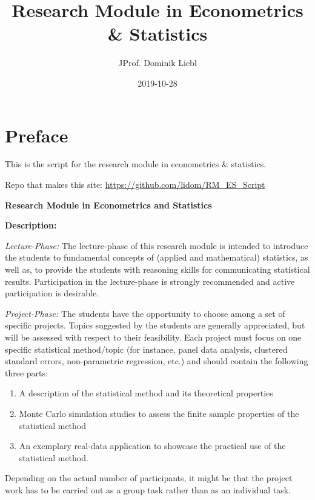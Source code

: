 \documentclass[]{book}
\title{Research Module in Econometrics \& Statistics}
\author{JProf. Dominik Liebl}
\date{2019-10-28}
\providecommand{\tightlist}{%
  \setlength{\itemsep}{0pt}\setlength{\parskip}{0pt}}
\theoremstyle{definition}
\theoremstyle{definition}
\theoremstyle{definition}
\theoremstyle{remark}
\begin{document}
\maketitle

{
\setcounter{tocdepth}{1}
\tableofcontents
}
\hypertarget{preface}{%
\chapter*{Preface}\label{preface}}

This is the script for the research module in econometrics \& statistics.

Repo that makes this site: \url{https://github.com/lidom/RM_ES_Script}

\textbf{Research Module in Econometrics and Statistics}

\textbf{Description:}

\emph{Lecture-Phase:} The lecture-phase of this research module is intended to introduce the students to fundamental concepts of (applied and mathematical) statistics, as well as, to provide the students with reasoning skills for communicating statistical results. Participation in the lecture-phase is strongly recommended and active participation is desirable.

\emph{Project-Phase:} The students have the opportunity to choose among a set of specific projects. Topics suggested by the students are generally appreciated, but will be assessed with respect to their feasibility. Each project must focus on one specific statistical method/topic (for instance, panel data analysis, clustered standard errors, non-parametric regression, etc.) and should contain the following three parts:

\begin{enumerate}
\def\labelenumi{\arabic{enumi}.}
\tightlist
\item
  A description of the statistical method and its theoretical properties
\item
  Monte Carlo simulation studies to assess the finite sample properties of the statistical method
\item
  An exemplary real-data application to showcase the practical use of the statistical method.
\end{enumerate}

Depending on the actual number of participants, it might be that the project work has to be carried out as a group task rather than as an individual task.
\end{document}
